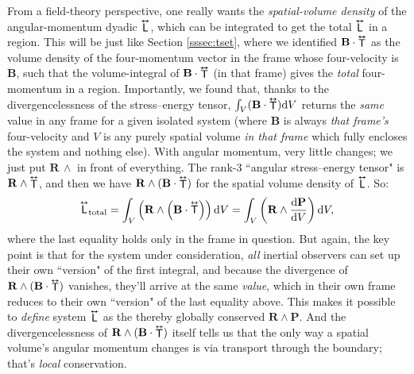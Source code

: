 \documentclass[12pt]{article}
\renewcommand{\vv}[1]{\mathbf{#1}}
\newcommand{\dd}[1]{\mathrm{d}#1}
\newcommand{\tightoverset}[2]{%
  \mathop{#2}\limits^{\vbox to -.5ex{\kern-0.75ex\hbox{$#1$}\vss}}}
\newcommand{\inlinedy}[1]{\tightoverset{\text{\tiny$\bm\leftrightarrow$}}{#1}}
\newcommand{\capdy}[1]{ \overset{ \text{\tiny$\bm\leftrightarrow$} }{\vphantom{\text{\small{A}}}\smash{#1}} }
\begin{document}
From a field-theory perspective, one really wants the \emph{spatial-volume density} of the angular-momentum dyadic $\inlinedy{\mathsf{L}}$, which can be integrated to get the total $\inlinedy{\mathsf{L}}$ in a region. This will be just like Section \ref{sssec:tset}, where we identified $\vv B \cdot {\inlinedy{\mathsf{T}}} $ as the volume density of the four-momentum vector in the frame whose four-velocity is $\vv B$, such that the volume-integral of $\vv B \cdot {\inlinedy{\mathsf{T}}} $ (in that frame) gives the \emph{total} four-momentum in a region. Importantly, we found that, thanks to the divergencelessness of the stress--energy tensor, $\int_V (\vv B \cdot {\inlinedy{\mathsf{T}}} ) \dd V$ returns the \emph{same} value in any frame for a given isolated system (where $\vv B$ is always \emph{that frame's} four-velocity and $V$ is any purely spatial volume \emph{in that frame} which fully encloses the system and nothing else). With angular momentum, very little changes; we just put $\vv R \, \wedge$ in front of everything. The rank-3 ``angular stress--energy tensor" is $\vv R \wedge {\inlinedy{\mathsf{T}}}$, and then we have $\vv R \wedge (\vv B \cdot {\inlinedy{\mathsf{T}}})$ for the spatial volume density of $\inlinedy{\mathsf{L}}$. So:
\begin{equation*}
\capdy{\mathsf{L}}_{\textrm{total}} = \int_V \left( \vv R \wedge \left( \vv B \cdot {\capdy{\mathsf{T}}} \right) \right) \dd V = \int_V \left( \vv R \wedge \dfrac{\dd \vv P}{\dd V} \right) \dd V,
\end{equation*}
where the last equality holds only in the frame in question. But again, the key point is that for the system under consideration, \emph{all} inertial observers can set up their own ``version" of the first integral, and because the divergence of $\vv R \wedge (\vv B \cdot {\inlinedy{\mathsf{T}}})$ vanishes, they'll arrive at the same \emph{value}, which in their own frame reduces to their own ``version" of the last equality above. This makes it possible to \emph{define} system $\inlinedy{\mathsf{L}}$ as the thereby globally conserved $\vv R \wedge \vv P$. And the divergencelessness of $\vv R \wedge (\vv B \cdot {\inlinedy{\mathsf{T}}})$ itself tells us that the only way a spatial volume's angular momentum changes is via transport through the boundary; that's \emph{local} conservation.
\end{document}

